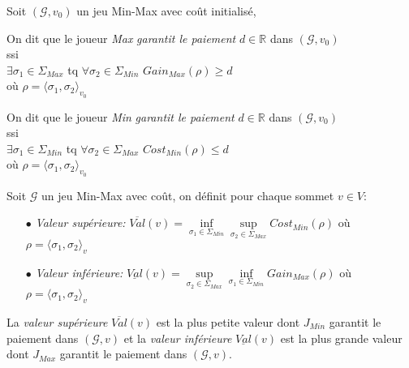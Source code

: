 \begin{defi}$\text{}$\\
	
	Soit $(\mathcal{G}, v_{0})$ un jeu Min-Max avec coût initialisé,
	
	\begin{center}On dit que le joueur \textit{Max} \textit{garantit le paiement} $d \in \mathbb{R}$ dans $(\mathcal{G}, v_{0})$\\ 
		ssi \\ 
	$\exists \sigma _{1} \in \Sigma _{Max}$ tq $\forall \sigma _{2} \in \Sigma _{Min}$ $ Gain_{Max}(\rho) \geq d$\\
	où $ \rho = \langle \sigma _{1},\sigma _{2} \rangle_{v_0}$\end{center}
	
	\begin{center} 
		On dit que le joueur \textit{Min} \textit{garantit le paiement} $d \in \mathbb{R}$ dans $(\mathcal{G}, v_{0})$\\		
		ssi	\\
		$\exists \sigma _{1}\in \Sigma _{Min}$ tq $\forall \sigma _{2} \in \Sigma _{Max}$ $ Cost_{Min}(\rho) \leq d$ \\
		où $ \rho = \langle \sigma _{1},\sigma _{2}\rangle_{v_0}$
		\end{center}

\end{defi}
		


\begin{defi}
	
	Soit $\mathcal{G}$ un jeu Min-Max avec coût, on définit pour chaque sommet $v \in V$: 
	\begin{enumerate}
		\item[$\bullet$]\textit{Valeur supérieure:} $\overline{Val}(v) = \inf\limits_{\sigma _{1} \in \Sigma _{Min}} \sup\limits_{\sigma _{2} \in \Sigma_{Max}} Cost_{Min}(\rho)$ où $\rho = \langle \sigma _{1},\sigma _{2}\rangle_v$
		
		\item[$\bullet$]\textit{Valeur inférieure:} $\underline{Val}(v) = \sup\limits_{\sigma _{2} \in \Sigma_{Max}}  \inf\limits_{\sigma _{1} \in \Sigma _{Min}} Gain_{Max}(\rho)$  où $\rho = \langle \sigma _{1},\sigma _{2}\rangle_v$
	\end{enumerate}
\end{defi}
\begin{rem}
	La \textit{valeur supérieure}  $\overline{Val}(v)$ est la plus petite valeur dont $J_{Min}$ garantit le paiement dans $(\mathcal{G},v)$ et la \textit{valeur inférieure} $\underline{Val}(v) $ est la plus grande valeur dont $J_{Max}$ garantit le paiement dans $(\mathcal{G},v)$.
\end{rem}

